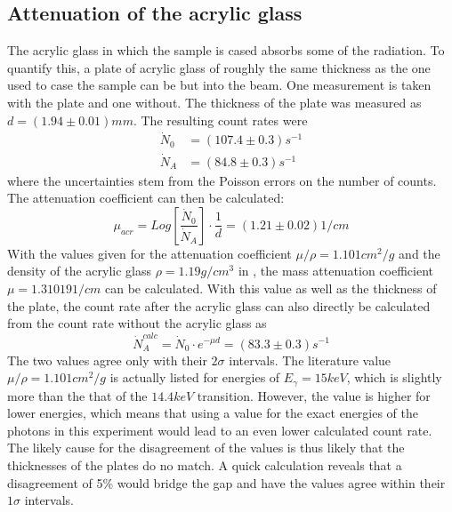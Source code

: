 \subsection{Attenuation of the acrylic glass}
The acrylic glass in which the sample is cased absorbs some of the radiation. To quantify this, a plate of acrylic glass of roughly the same thickness as the one used to case the sample can be but into the beam. One measurement is taken with the plate and one without. The thickness of the plate was measured as $d=\unit{(1.94\pm0.01)}{mm}$. The resulting count rates were
\begin{align}
\dot{N}_0&=\unit{(107.4\pm0.3)}{s^{-1}}\\
\dot{N}_A&=\unit{(84.8\pm0.3)}{s^{-1}}
\end{align}
where the uncertainties stem from the Poisson errors on the number of counts. The attenuation coefficient can then be calculated:
\begin{equation}
\mu_{acr}=Log\left[\frac{\dot{N}_0}{\dot{N}_A}\right]\cdot\frac{1}{d}=\unit{(1.21\pm0.02)}{1/cm}
\end{equation}
With the values given for the attenuation coefficient $\mu/\rho=\unit{1.101}{cm^2/g}$ and the density of the acrylic glass $\rho=\unit{1.19}{g/cm^3}$ in \cite{anleitung}, the mass attenuation coefficient $\mu=\unit{1.31019}{1/cm}$ can be calculated. With this value as well as the thickness of the plate, the count rate after the acrylic glass can also directly be calculated from the count rate without the acrylic glass as
\begin{equation}
\dot{N}_A^{calc}=\dot{N}_0\cdot e^{-\mu d}=\unit{(83.3\pm0.3)}{s^{-1}}
\end{equation}
The two values agree only with their $2\sigma$ intervals. The literature value $\mu/\rho=\unit{1.101}{cm^2/g}$ is actually listed for energies of $E_\gamma=\unit{15}{keV}$, which is slightly more than the that of the $\unit{14.4}{keV}$ transition. However, the value is higher for lower energies, which means that using a value for the exact energies of the photons in this experiment would lead to an even lower calculated count rate. The likely cause for the disagreement of the values is thus likely that the thicknesses of the plates do no match. A quick calculation reveals that a disagreement of 5\% would bridge the gap and have the values agree within their $1\sigma$ intervals.